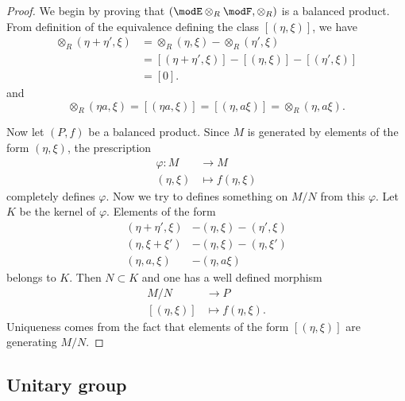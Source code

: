 \begin{proof}
We begin by proving that $(\modE\otimes_R\modF,\otimes_R)$ is a balanced product. From definition of the equivalence defining the class $[(\eta,\xi)]$, we have
\[ 
 \begin{split}
  \otimes_R(\eta+\eta',\xi)&=\otimes_R(\eta,\xi)-\otimes_R(\eta',\xi)\\
		&=[(\eta+\eta',\xi)]-[(\eta,\xi)]-[(\eta',\xi)]\\
		&=[0].
\end{split} 
\]
and 
\[ 
  \otimes_R(\eta a,\xi)=[(\eta a,\xi)]=[(\eta,a\xi)]=\otimes_R(\eta, a\xi).
\]

Now let $(P,f)$ be a balanced product. Since $M$ is generated by elements of the form $(\eta,\xi)$, the prescription
\begin{equation}
\begin{aligned}
 \varphi\colon M&\to M \\ 
(\eta,\xi)&\mapsto f(\eta,\xi) 
\end{aligned}
\end{equation} 
completely defines $\varphi$. Now we try to defines something on $M/N$ from this $\varphi$. Let $K$ be the kernel of $\varphi$. Elements of the form
\[ 
 \begin{split}
(\eta+\eta',\xi)&-(\eta,\xi)-(\eta',\xi)\\
(\eta,\xi+\xi')&-(\eta,\xi)-(\eta,\xi')\\
(\eta,a,\xi)&-(\eta, a\xi)
\end{split} 
\]
belongs to $K$. Then $N\subset K$ and one has a well defined morphism 
\begin{equation}
\begin{aligned}
 M/N&\to P \\ 
[(\eta,\xi)]&\mapsto f(\eta,\xi).
\end{aligned}
\end{equation}
Uniqueness comes from the fact that elements of the form $[(\eta,\xi)]$ are generating $M/N$.

\end{proof}





\subsection{Unitary group}		\label{SubsecUnitGroup}

